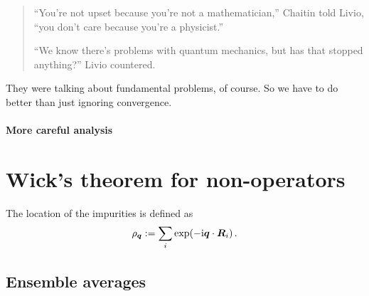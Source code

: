 \documentclass[11pt, english, fleqn, DIV=15, headinclude, BCOR=1cm]{scrartcl}
\begin{document}
\begin{quote}
    \enquote{You're not upset because you're not a mathematician,} Chaitin told
    Livio, \enquote{you don't care because you're a physicist.} 

    \enquote{We know there's problems with quantum mechanics, but has that
    stopped anything?} Livio countered.
\end{quote}

They were talking about fundamental problems, of course. So we have to do
better than just ignoring convergence.

\paragraph{More careful analysis}

\section{Wick's theorem for non-operators}
\label{homework:3}

The location of the impurities is defined as
\[
    \rho_{\vec q} := \sum_i \exp(- \iup \vec q \cdot \vec R_i) \,.
\]

\subsection{Ensemble averages}
\end{document}
